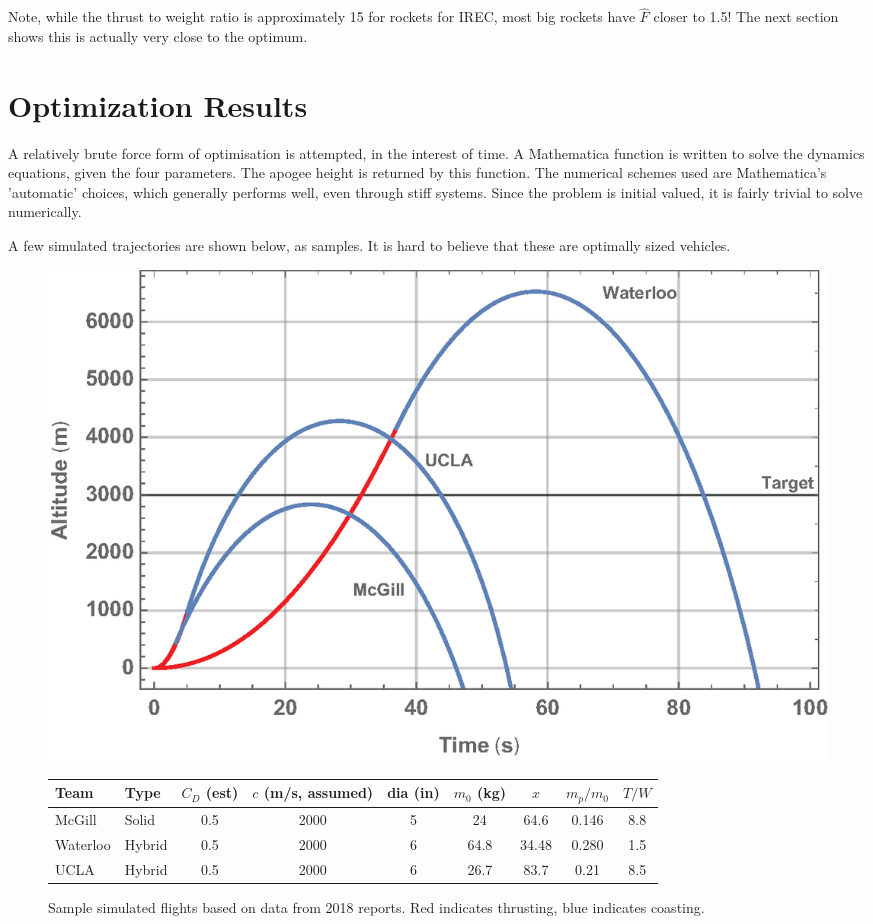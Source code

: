 \documentclass[12pt]{article}
\begin{document}
Note, while the thrust to weight ratio is approximately 15 for rockets for IREC, most big rockets have $\hat F$ closer to 1.5! The next section shows this is actually very close to the optimum.


\section{Optimization Results}

A relatively brute force form of optimisation is attempted, in the interest of time. A Mathematica function is written to solve the dynamics equations, given the four parameters. The apogee height is returned by this function. The numerical schemes used are Mathematica's 'automatic' choices, which generally performs well, even through stiff systems. Since the problem is initial valued, it is fairly trivial to solve numerically. 

A few simulated trajectories are shown below, as samples. It is hard to believe that these are optimally sized vehicles. 

\begin{figure}[htbp]
   \centering
   \includegraphics[width=0.8\linewidth]{sample_flights.eps}
   \caption{Sample simulated flights based on data from 2018 reports. Red indicates thrusting, blue indicates coasting.}
   
      \begin{tabular}{@{} llcccc|ccc@{}}
         \toprule
         Team &Type & $C_D$ (est) & $c$ (m/s, assumed) & dia (in) & $m_0$ (kg) &  $x$ & $m_p/m_0$ & $T/W$ \\ 
         \midrule
         McGill & Solid & 0.5 & 2000 & 5 & 24 & 64.6 &0.146 & 8.8\\
         Waterloo& Hybrid & 0.5 & 2000 & 6 & 64.8 & 34.48 &0.280 & 1.5\\
         UCLA & Hybrid &0.5 & 2000 & 6 & 26.7 & 83.7 & 0.21 & 8.5\\
         \bottomrule
      \end{tabular}
    \label{fig:}
\end{figure}
\end{document}
